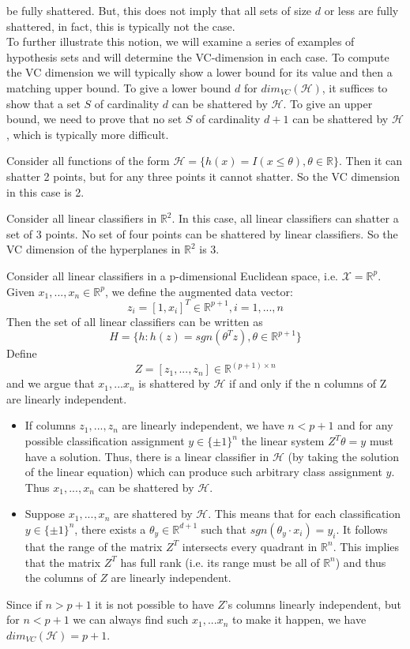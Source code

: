 be fully shattered. But, this does not imply that all sets of size $d$ or less are fully
shattered, in fact, this is typically not the case.\\
To further illustrate this notion, we will examine a series of examples of hypothesis
sets and will determine the VC-dimension in each case. To compute the VC dimension we will typically show a lower bound for its value and then a matching upper bound. To give a lower bound $d$ for $dim_{VC}(\mathcal{H})$, it suffices to show that a set $S$ of cardinality $d$ can be shattered by $\mathcal{H}$. To give an upper bound, we need to prove that no set $S$ of cardinality $d+1$ can be shattered by $\mathcal{H}$, which is typically more difficult.\\
\begin{example}
	Consider all functions of the form $\mathcal{H}=\{h(x)=I(x\leq \theta), \theta \in \mathbb{R}\}$. Then it can shatter 2 points, but for any three points it cannot shatter. So the VC dimension in this case is 2.
\end{example}
\begin{example}
	Consider all linear classifiers in $\mathbb{R}^2$. In this case, all linear classifiers can
	shatter a set of 3 points. No set of four points can be shattered by linear classifiers. So the VC dimension of the hyperplanes in $\mathbb{R}^2$ is 3.
\end{example}
\begin{example}
	Consider all linear classifiers in a p-dimensional Euclidean space, i.e. $\mathcal{X}=\mathbb{R}^p$. Given $x_1,...,x_n \in \mathbb{R}^p$, we define the augmented data vector:\\
	$$z_i=[1,x_i]^T \in \mathbb{R}^{p+1}, i=1,...,n $$
	Then the set of all linear classifiers can be written as
	$$H=\{h:h(z)=sgn(\theta^Tz),\theta\in \mathbb{R}^{p+1}\}$$
	Define
	$$Z=[z_1,...,z_n] \in \mathbb{R}^{(p+1)\times n}$$
	and we argue that $x_1,...x_n$ is shattered by $\mathcal{H}$ if and only if the n columns of Z are linearly independent.
	\begin{itemize}
		\item If columns $z_1,...,z_n$ are linearly independent, we have $n<p+1$ and for any possible classification assignment $y \in \{\pm1\}^n$ the linear system $Z^T \theta=y$ must have a solution. Thus, there is a linear classifier in $\mathcal{H}$ (by taking the solution of the linear equation) which can produce such arbitrary class assignment $y$. Thus $x_1,...,x_n$ can be shattered by $\mathcal{H}$.
		\item Suppose $x_1,...,x_n$ are shattered by $\mathcal{H}$. 
		This means that for each classification $y\in \{\pm1\}^n$, there exists a 
		$\theta_y\in \mathbb{R}^{d+1}$ such that $sgn(\theta_y\cdot x_i) = y_i$. It follows that the range of the matrix
		$Z^T$ intersects every quadrant in $\mathbb{R}^n$. This implies that the matrix $Z^T$ has full rank (i.e. its
		range must be all of $\mathbb{R}^n$) and thus the columns of $Z$ are linearly independent.
	\end{itemize}
	Since if $n>p+1$ it is not possible to have $Z$'s columns linearly independent, but for $n<p+1$ we can always find such $x_1,...x_n$ to make it happen, we have $dim_{VC}(\mathcal{H})=p+1$.
\end{example}
